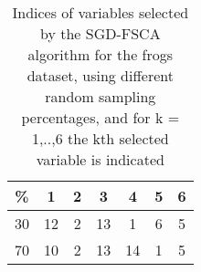 \begin{table}
	\begin{center}
		\begin{tabular}{c c c c c c c}
			\% & 1 & 2 & 3 & 4 & 5 & 6 \\
			\hline
			30 & 12 & 2 & 13 & 1 & 6 & 5 \\
			70 & 10 & 2 & 13 & 14 & 1 & 5 \\
		\end{tabular}
	\end{center}
	\caption{Indices of variables selected by the SGD-FSCA algorithm for the frogs dataset, using different random sampling percentages, and for k = 1,..,6 the kth selected variable is indicated}
\end{table}